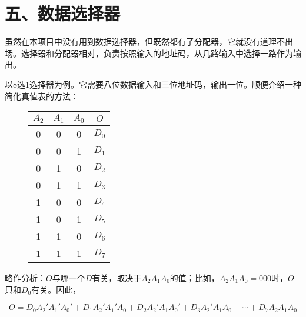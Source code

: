 \documentclass[UTF8]{ctexart}
\begin{document}
\section*{五、数据选择器}

虽然在本项目中没有用到数据选择器，但既然都有了分配器，它就没有道理不出场。选择器和分配器相对，负责按照输入的地址码，从几路输入中选择一路作为输出。

以8选1选择器为例。它需要八位数据输入和三位地址码，输出一位。顺便介绍一种简化真值表的方法：

\begin{figure}
    \begin{tabular}{|c|c|c|c|}\hline\rowcolor{lightgray}
        $A_2$ & $A_1$ & $A_0$ & $O$ \\\hline
        0&0&0&$D_0$\\\hline
        0&0&1&$D_1$\\\hline
        0&1&0&$D_2$\\\hline
        0&1&1&$D_3$\\\hline
        1&0&0&$D_4$\\\hline
        1&0&1&$D_5$\\\hline
        1&1&0&$D_6$\\\hline
        1&1&1&$D_7$\\\hline
    \end{tabular}
\end{figure}

略作分析：$O$与哪一个$D$有关，取决于$A_2A_1A_0$的值；比如，$A_2A_1A_0=000$时，$O$只和$D_0$有关。因此，

\[O=D_0A_2'A_1'A_0'+D_1A_2'A_1'A_0+D_2A_2'A_1A_0'+D_3A_2'A_1A_0+\cdots+D_7A_2A_1A_0\]
\end{document}
